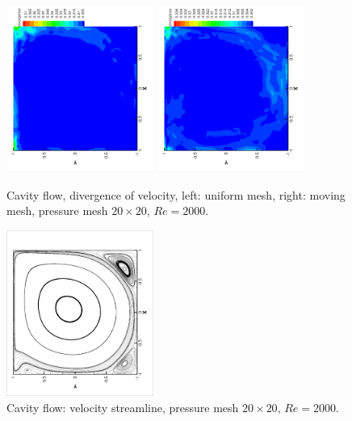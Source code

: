 \documentclass{eajam}
\begin{document}
       \begin{figure}[!htbp]
         \begin{center}
             \includegraphics[width = 0.43\textwidth, angle = -90]{picture/cavity_flow_data/divergence_uniform_1.eps}
             \includegraphics[width = 0.43\textwidth, angle = -90]{picture/cavity_flow_data/divergence_moving_1.eps}
        \end{center}
        \caption{\small Cavity flow, divergence of velocity, left: uniform mesh,
          right: moving mesh, pressure mesh $20 \times 20$, $Re = 2000$.}
        \label{fig::cavity_flow_divergence}
       \end{figure}

       \begin{figure}[!htbp]
         \begin{center}
             \includegraphics[width = 0.43\textwidth, angle = -90]{picture/cavity_flow_data/streamline_mesh20.eps}
        \end{center}
        \caption{\small Cavity flow: velocity streamline, pressure
          mesh $20 \times 20$, $Re = 2000$.}
        \label{fig::cavity_flow_streamline}
       \end{figure}
\end{document}
